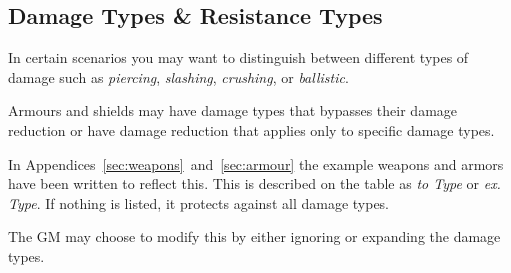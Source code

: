 \subsection{Damage Types \& Resistance Types}
In certain scenarios you may want to distinguish between different types of damage such as \textit{piercing}, \textit{slashing}, \textit{crushing}, or \textit{ballistic}.

Armours and shields may have damage types that bypasses their damage reduction or have damage reduction that applies only to specific damage types.

In Appendices~\ref{sec:weapons}~and~\ref{sec:armour} the example weapons and armors have been written to reflect this.
This is described on the table as \textit{to Type} or \textit{ex. Type}.
If nothing is listed, it protects against all damage types.

The GM may choose to modify this by either ignoring or expanding the damage types.